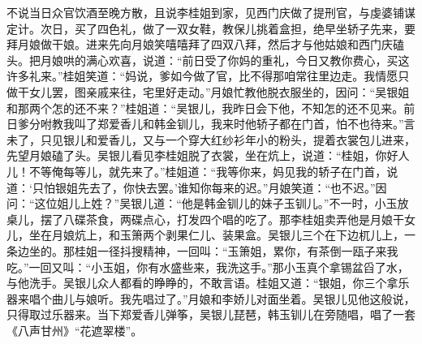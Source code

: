 不说当日众官饮酒至晚方散，且说李桂姐到家，见西门庆做了提刑官，与虔婆铺谋定计。次日，买了四色礼，做了一双女鞋，教保儿挑着盒担，绝早坐轿子先来，要拜月娘做干娘。进来先向月娘笑嘻嘻拜了四双八拜，然后才与他姑娘和西门庆磕头。把月娘哄的满心欢喜，说道：“前日受了你妈的重礼，今日又教你费心，买这许多礼来。”桂姐笑道：“妈说，爹如今做了官，比不得那咱常往里边走。我情愿只做干女儿罢，图亲戚来往，宅里好走动。”月娘忙教他脱衣服坐的，因问：“吴银姐和那两个怎的还不来？”桂姐道：“吴银儿，我昨日会下他，不知怎的还不见来。前日爹分咐教我叫了郑爱香儿和韩金钏儿，我来时他轿子都在门首，怕不也待来。”言未了，只见银儿和爱香儿，又与一个穿大红纱衫年小的粉头，提着衣裳包儿进来，先望月娘磕了头。吴银儿看见李桂姐脱了衣裳，坐在炕上，说道：“桂姐，你好人儿！不等俺每等儿，就先来了。”桂姐道：“我等你来，妈见我的轿子在门首，说道：‘只怕银姐先去了，你快去罢。’谁知你每来的迟。”月娘笑道：“也不迟。”因问：“这位姐儿上姓？”吴银儿道：“他是韩金钏儿的妹子玉钏儿。”不一时，小玉放桌儿，摆了八碟茶食，两碟点心，打发四个唱的吃了。那李桂姐卖弄他是月娘干女儿，坐在月娘炕上，和玉箫两个剥果仁儿、装果盒。吴银儿三个在下边杌儿上，一条边坐的。那桂姐一径抖搜精神，一回叫：“玉箫姐，累你，有茶倒一瓯子来我吃。”一回又叫：“小玉姐，你有水盛些来，我洗这手。”那小玉真个拿锡盆舀了水，与他洗手。吴银儿众人都看的睁睁的，不敢言语。桂姐又道：“银姐，你三个拿乐器来唱个曲儿与娘听。我先唱过了。”月娘和李娇儿对面坐着。吴银儿见他这般说，只得取过乐器来。当下郑爱香儿弹筝，吴银儿琵琶，韩玉钏儿在旁随唱，唱了一套《八声甘州》“花遮翠楼”。

